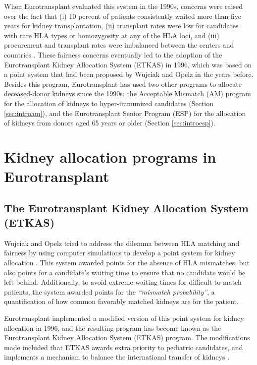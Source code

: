 \documentclass[11pt,twoside,]{book}
\begin{document}
When Eurotransplant evaluated this system in the 1990s, concerns were raised
over the fact that (i) 10 percent of patients consistently waited more than five years
for kidney transplantation, (ii) transplant rates were low for candidates with
rare HLA types or homozygosity at any of the HLA loci, and (iii) procurement
and transplant rates were imbalanced between the centers and countries
\citep{DeMeester1998_booksection}. These fairness concerns
eventually led to the adoption of the Eurotransplant Kidney Allocation System
(ETKAS) in 1996, which was based on a point system that had been proposed by
Wujciak and Opelz in the years before. Besides this program, Eurotransplant
has used two other programs to allocate deceased-donor kidneys since the 1990s:
the Acceptable Mismatch (AM) program for the allocation of kidneys to hyper-immunized candidates (Section
\ref{sec:introam}), and the Eurotransplant Senior Program (ESP) for the allocation
of kidneys from donors aged 65 years or older (Section \ref{sec:introesp}).

\newpage

\section{Kidney allocation programs in Eurotransplant}\label{kidney-allocation-programs-in-eurotransplant}

\subsection{The Eurotransplant Kidney Allocation System (ETKAS)}\label{the-eurotransplant-kidney-allocation-system-etkas}

Wujciak and Opelz tried to address the dilemma between HLA
matching and fairness by using computer simulations to develop a point system
for kidney allocation \citep{wujciakProposalImprovedCadaver1993a, Opelz1998}. This
system awarded points for the absence of HLA mismatches, but also points for
a candidate's waiting time to ensure that no candidate would be left behind.
Additionally, to avoid extreme waiting times for difficult-to-match patients,
the system awarded points for the \emph{``mismatch probability''}, a quantification of
how common favorably matched kidneys are for the patient.

Eurotransplant implemented a modified version of this point system for kidney
allocation in 1996, and the resulting program has become known as the
Eurotransplant Kidney Allocation System (ETKAS) program. The modifications made
included that ETKAS awards extra priority to pediatric candidates, and implements
a mechanism to balance the international transfer of kidneys \citep{Opelz1998}.
\end{document}
